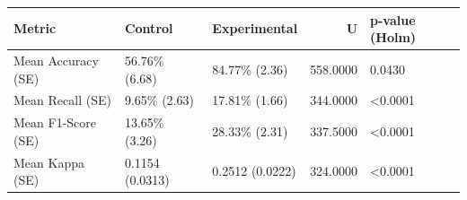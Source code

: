 \begin{tabular}{lllrl}
\toprule
Metric & Control & Experimental & U & p-value (Holm) \\
\midrule
Mean Accuracy (SE) & 56.76\% (6.68) & 84.77\% (2.36) & 558.0000 & 0.0430 \\
Mean Recall (SE) & 9.65\% (2.63) & 17.81\% (1.66) & 344.0000 & <0.0001 \\
Mean F1-Score (SE) & 13.65\% (3.26) & 28.33\% (2.31) & 337.5000 & <0.0001 \\
Mean Kappa (SE) & 0.1154 (0.0313) & 0.2512 (0.0222) & 324.0000 & <0.0001 \\
\bottomrule
\end{tabular}
